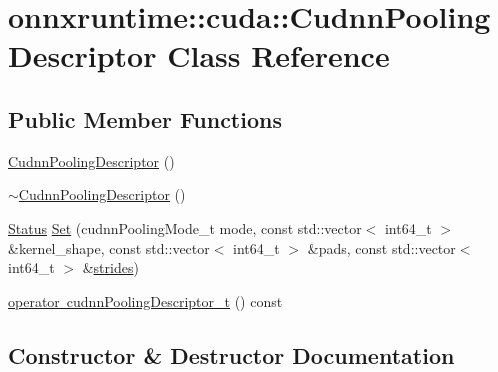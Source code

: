 \hypertarget{classonnxruntime_1_1cuda_1_1CudnnPoolingDescriptor}{}\section{onnxruntime\+:\+:cuda\+:\+:Cudnn\+Pooling\+Descriptor Class Reference}
\label{classonnxruntime_1_1cuda_1_1CudnnPoolingDescriptor}
\subsection*{Public Member Functions}
\begin{DoxyCompactItemize}
\item 
\mbox{\hyperlink{classonnxruntime_1_1cuda_1_1CudnnPoolingDescriptor_a41f2dd93c2f243bd2fda2de8df29b131}{Cudnn\+Pooling\+Descriptor}} ()
\item 
\mbox{\hyperlink{classonnxruntime_1_1cuda_1_1CudnnPoolingDescriptor_aa7ffc8641d01e519aa4ec728ee9bf720}{$\sim$\+Cudnn\+Pooling\+Descriptor}} ()
\item 
\mbox{\hyperlink{classonnxruntime_1_1common_1_1Status}{Status}} \mbox{\hyperlink{classonnxruntime_1_1cuda_1_1CudnnPoolingDescriptor_aab1a9ed2ecd33fa0cfd5a173bf4c9f35}{Set}} (cudnn\+Pooling\+Mode\+\_\+t mode, const std\+::vector$<$ int64\+\_\+t $>$ \&kernel\+\_\+shape, const std\+::vector$<$ int64\+\_\+t $>$ \&pads, const std\+::vector$<$ int64\+\_\+t $>$ \&\mbox{\hyperlink{mkldnn_2nn_2pool_8cc_abdced837e2fca213b15df1588e8782c4}{strides}})
\item 
\mbox{\hyperlink{classonnxruntime_1_1cuda_1_1CudnnPoolingDescriptor_a53aab8aafe3fa84d01f5523c2af8cf32}{operator cudnn\+Pooling\+Descriptor\+\_\+t}} () const
\end{DoxyCompactItemize}


\subsection{Constructor \& Destructor Documentation}
\mbox{\label{classonnxruntime_1_1cuda_1_1CudnnPoolingDescriptor_a41f2dd93c2f243bd2fda2de8df29b131}} 
